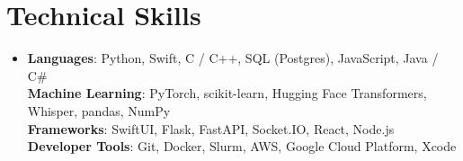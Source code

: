 \documentclass[letterpaper,11pt]{article}
\begin{document}
\section{Technical Skills}
 \begin{itemize}[leftmargin=0.15in, label={}]
    \item \small
     \textbf{Languages}{: Python, Swift, C / C++, SQL (Postgres), JavaScript, Java / C\#}\\
     \textbf{Machine Learning}{: PyTorch, scikit-learn, Hugging Face Transformers, Whisper, pandas, NumPy}\\
     \textbf{Frameworks}{: SwiftUI, Flask, FastAPI, Socket.IO, React, Node.js}\\
     \textbf{Developer Tools}{: Git, Docker, Slurm, AWS, Google Cloud Platform, Xcode}
 \end{itemize}


\end{document}
